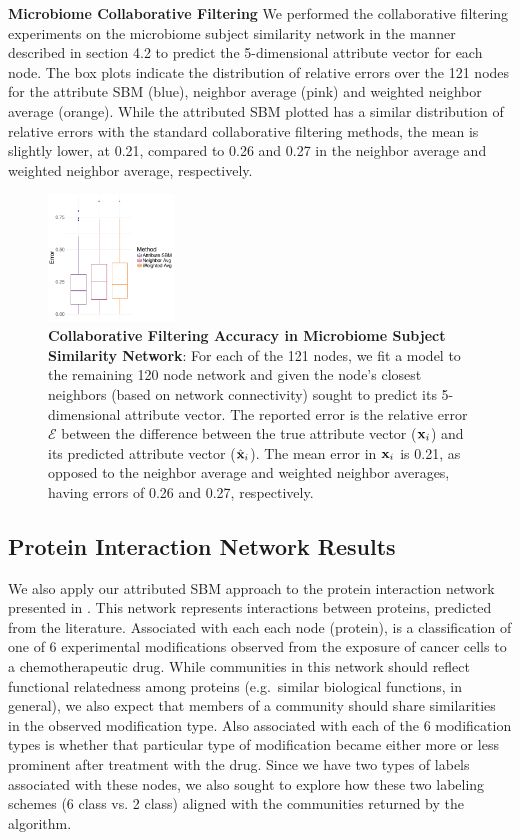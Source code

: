 \documentclass[journal]{IEEEtran}
\begin{document}
{\bf Microbiome Collaborative Filtering}
We performed the collaborative filtering experiments on the microbiome subject similarity network in the manner described in section 4.2 to predict the 5-dimensional attribute vector for each node. The box plots indicate the distribution of relative errors over the 121 nodes for the attribute SBM (blue), neighbor average (pink) and weighted neighbor average (orange). While the attributed SBM plotted has a similar distribution of relative errors with the standard collaborative filtering methods, the mean is slightly lower, at 0.21, compared to 0.26 and 0.27 in the neighbor average and weighted neighbor average, respectively.
\begin{figure}[h!]
\begin{center}
\includegraphics[width=0.3\textwidth]{CollabFilterMicro.pdf}
\caption{{\bf Collaborative Filtering Accuracy in Microbiome Subject Similarity Network}: For each of the 121 nodes, we fit a model to the remaining 120 node network and given the node's closest  neighbors (based on network connectivity) sought to predict its 5-dimensional attribute vector. The reported error is the relative error $\mathcal{E}$ between the difference between the true attribute vector (${\bf x}_{i}$) and its predicted attribute vector (${\hat{\bf x}}_{i}$). The mean error in ${\bf x}_{i}$ is 0.21, as opposed to the neighbor average and weighted neighbor averages, having errors of 0.26 and 0.27, respectively. }
\end{center}
\end{figure}

\subsection{Protein Interaction Network Results}
We also apply our attributed SBM approach to the protein interaction network presented in \cite{bonacci}. This network represents interactions between proteins, predicted from the literature. Associated with each each node (protein), is a classification of one of 6 experimental modifications observed from the exposure of cancer cells to a chemotherapeutic drug. While communities in this network should reflect functional relatedness among proteins (e.g.\ similar biological functions, in general), we also expect that members of a community should share similarities in the observed modification type. Also associated with each of the 6 modification types is whether that particular type of modification became either more or less prominent after treatment with the drug. Since we have two types of labels associated with these nodes, we also sought to explore how these two labeling schemes (6 class vs. 2 class) aligned with the communities returned by the algorithm. 
\end{document}
